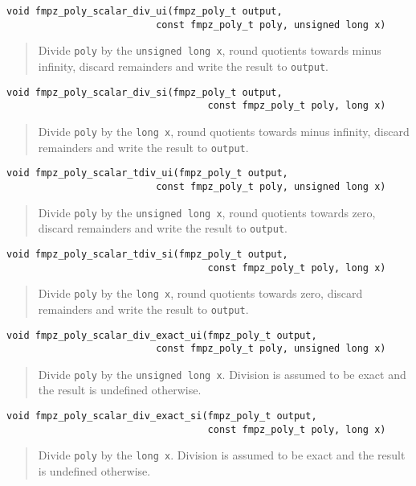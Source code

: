 \documentclass[a4paper,10pt]{article}
\newcommand{\code}{\lstinline}
\begin{document}
\begin{lstlisting}
void fmpz_poly_scalar_div_ui(fmpz_poly_t output, 
                          const fmpz_poly_t poly, unsigned long x)
\end{lstlisting}
\begin{quote}
Divide \code{poly} by the \code{unsigned long x}, round quotients towards minus infinity, discard remainders and write the result to \code{output}. 
\end{quote}

\begin{lstlisting}
void fmpz_poly_scalar_div_si(fmpz_poly_t output, 
                                   const fmpz_poly_t poly, long x)
\end{lstlisting}
\begin{quote}
Divide \code{poly} by the \code{long x}, round quotients towards minus infinity, discard remainders and write the result to \code{output}.
\end{quote}

\begin{lstlisting}
void fmpz_poly_scalar_tdiv_ui(fmpz_poly_t output, 
                          const fmpz_poly_t poly, unsigned long x)
\end{lstlisting}
\begin{quote}
Divide \code{poly} by the \code{unsigned long x}, round quotients towards zero, discard remainders and write the result to \code{output}.
\end{quote}

\begin{lstlisting}
void fmpz_poly_scalar_tdiv_si(fmpz_poly_t output, 
                                   const fmpz_poly_t poly, long x)
\end{lstlisting}
\begin{quote}
Divide \code{poly} by the \code{long x}, round quotients towards zero, discard remainders and write the result to \code{output}.
\end{quote}

\begin{lstlisting}
void fmpz_poly_scalar_div_exact_ui(fmpz_poly_t output, 
                          const fmpz_poly_t poly, unsigned long x)
\end{lstlisting}
\begin{quote}
Divide \code{poly} by the \code{unsigned long x}. Division is assumed to be exact and the result is undefined otherwise.
\end{quote}

\begin{lstlisting}
void fmpz_poly_scalar_div_exact_si(fmpz_poly_t output, 
                                   const fmpz_poly_t poly, long x)
\end{lstlisting}
\begin{quote}
Divide \code{poly} by the \code{long x}. Division is assumed to be exact and the result is undefined otherwise.
\end{quote}
\end{document}
